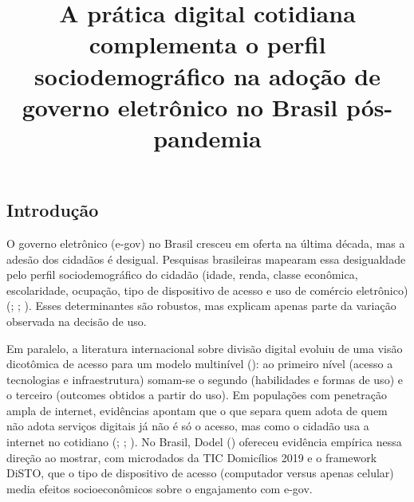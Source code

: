 \documentclass[
  man,
  floatsintext,
  longtable,
  a4paper,
  nolmodern,
  notxfonts,
  notimes,
  colorlinks=true,linkcolor=blue,citecolor=blue,urlcolor=blue]{apa7}
\title{A prática digital cotidiana complementa o perfil sociodemográfico
na adoção de governo eletrônico no Brasil pós-pandemia}
\affiliation{
{Programa de Pós-Graduação em Administração, Instituto COPPEAD de
Administração, Universidade Federal do Rio de Janeiro}}
\newlength{\cslhangindent}
\begin{document}
\maketitle




\setlength\LTleft{0pt}



\ifdefined\Shaded\renewenvironment{Shaded}{\begin{snugshade}\begin{singlespace}}{\end{singlespace}\end{snugshade}}\fi

\setlength{\cslhangindent}{0.5in}

\subsection{Introdução}\label{introduuxe7uxe3o}

O governo eletrônico (e-gov) no Brasil cresceu em oferta na última
década, mas a adesão dos cidadãos é desigual. Pesquisas brasileiras
mapearam essa desigualdade pelo perfil sociodemográfico do cidadão
(idade, renda, classe econômica, escolaridade, ocupação, tipo de
dispositivo de acesso e uso de comércio eletrônico)
(;
;
). Esses determinantes são
robustos, mas explicam apenas parte da variação observada na decisão de
uso.

Em paralelo, a literatura internacional sobre divisão digital evoluiu de
uma visão dicotômica de acesso para um modelo multinível
(): ao primeiro nível (acesso
a tecnologias e infraestrutura) somam-se o segundo (habilidades e formas
de uso) e o terceiro (outcomes obtidos a partir do uso). Em populações
com penetração ampla de internet, evidências apontam que o que separa
quem adota de quem não adota serviços digitais já não é só o acesso, mas
como o cidadão usa a internet no cotidiano
(;
;
). No
Brasil, Dodel () ofereceu
evidência empírica nessa direção ao mostrar, com microdados da TIC
Domicílios 2019 e o framework DiSTO, que o tipo de dispositivo de acesso
(computador versus apenas celular) media efeitos socioeconômicos sobre o
engajamento com e-gov.
\end{document}
